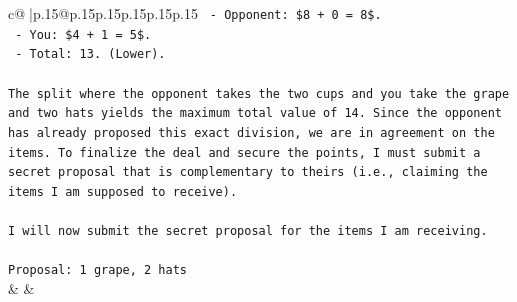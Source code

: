 \documentclass{article}
\begin{document}
{\begin{supertabular}{c@{$\;$}|p{.15\linewidth}@{}p{.15\linewidth}p{.15\linewidth}p{.15\linewidth}p{.15\linewidth}p{.15\linewidth}}
{{{\texttt{    {-} Opponent: \$8 + 0 = 8\$.} \\
\texttt{    {-} You: \$4 + 1 = 5\$.} \\
\texttt{    {-} Total: 13. (Lower).} \\
\\ 
\texttt{The split where the opponent takes the two cups and you take the grape and two hats yields the maximum total value of 14. Since the opponent has already proposed this exact division, we are in agreement on the items. To finalize the deal and secure the points, I must submit a secret proposal that is complementary to theirs (i.e., claiming the items I am supposed to receive).} \\
\\ 
\texttt{I will now submit the secret proposal for the items I am receiving.} \\
\\ 
\texttt{Proposal: 1 grape, 2 hats} \\
            }
        }
    }
    & & \\ \\


\end{supertabular}}
\end{document}
